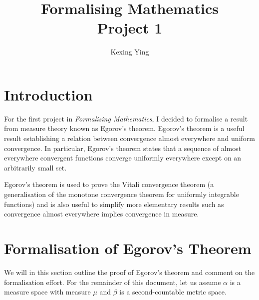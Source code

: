 \documentclass[]{article}
\title{Formalising Mathematics\\
  \large Project 1}
\author{Kexing Ying}
\theoremstyle{definition}
\begin{document}
\maketitle

\section*{Introduction}

For the first project in \textit{Formalising Mathematics}, I decided to formalise a result from 
measure theory known as Egorov's theorem. Egorov's theorem is a useful result establishing a 
relation between convergence almost everywhere and uniform convergence. In particular, 
Egorov's theorem states that a sequence of almost everywhere convergent functions 
converge uniformly everywhere except on an arbitrarily small set.

Egorov's theorem is used to prove the Vitali convergence theorem 
(a generalisation of the monotone convergence theorem for uniformly integrable functions)
and is also useful to simplify more elementary results such as convergence almost 
everywhere implies convergence in measure. 

\section*{Formalisation of Egorov's Theorem}

We will in this section outline the proof of Egorov's theorem and comment on the formalisation effort.
For the remainder of this document, let us assume \(\alpha\) is a measure space with measure \(\mu\) 
and \(\beta\) is a second-countable metric space.
\end{document}
